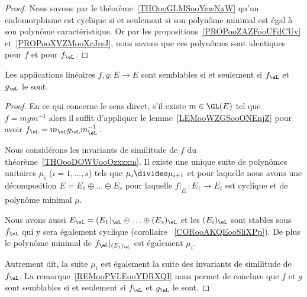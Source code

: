\begin{proof}
    Nous savons par le théorème~\ref{THOooGLMSooYewNxW} qu'un endomorphisme est cyclique si et seulement si son polynôme minimal est égal à son polynôme caractéristique. Or par les propositions~\ref{PROPooZAZFooUFdCUv} et~\ref{PROPooXVZMooXcJrsJ}, nous savons que ces polynômes sont identiques pour \( f\) et pour \( f_{\eL}\).
\end{proof}

\begin{theorem}      \label{THOooHUFBooReKZWG}
    Les applications linéaires \( f,g\colon E\to E\) sont semblables si et seulement si \( f_{\eL}\) et \( g_{\eL}\) le sont.
\end{theorem}

\begin{proof}
    En ce qui concerne le sens direct, s'il existe \( m\in\GL(E)\) tel que \( f=mgm^{-1}\) alors il suffit d'appliquer le lemme~\ref{LEMooWZGSooONEnjZ} pour avoir \( f_{\eL}=m_{\eL}g_{\eL}m_{\eL}^{-1}\).

    Nous considérons les invariants de similitude de \( f\) du théorème~\ref{THOooDOWUooOzxzxm}. Il existe une unique suite de polynômes unitaires \( \mu_i\) ($i=1,\ldots, s$) tels que \( \mu_i\divides \mu_{i+1}\) et pour laquelle nous avons une décomposition \( E=E_1\oplus \ldots\oplus E_s\) pour laquelle \( f|_{E_i}\colon E_1\to E_i\) est cyclique et de polynôme minimal \( \mu\).

    Nous avons aussi \( E_{\eL}=(E_1)_{\eL}\oplus\ldots \oplus (E_s)_{\eL}\) et les \( (E_i)_{\eL}\) sont stables sous \( f_{\eL}\) qui y sera également cyclique (corollaire ~\ref{CORooAKQEooSliXPp}). De plus le polynôme minimal de \( f_{\eL}|_{(E_i)_{\eL}}\) est également \( \mu_i\).

    Autrement dit, la suite \( \mu_i\) est également la suite des invariants de similitude de \( f_{\eL}\). La remarque~\ref{REMooPVLEooYDRXQI} nous permet de conclure que \( f\) et \( g\) sont semblables si et seulement si \( f_{\eL}\) et \( g_{\eL}\) le sont.
\end{proof}
